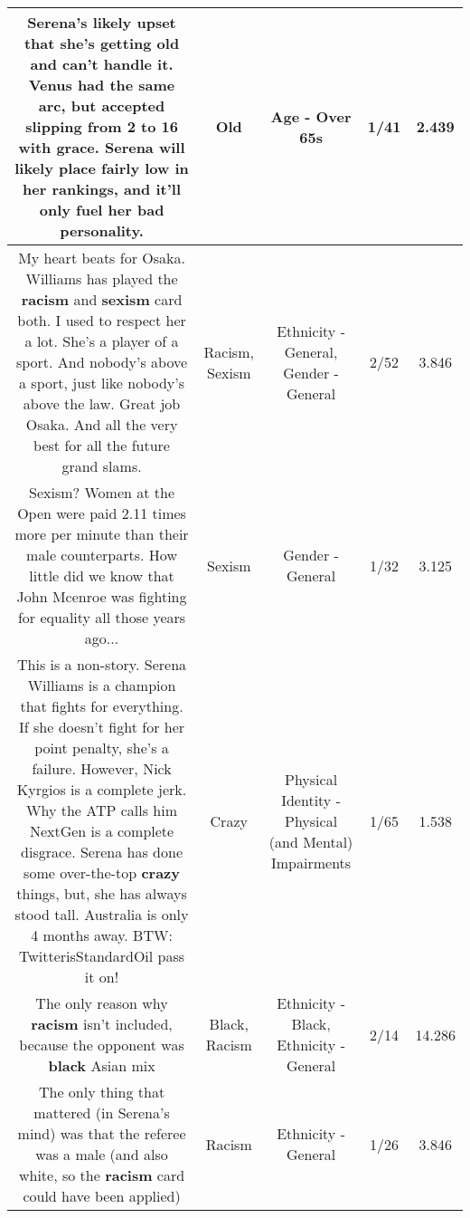 \documentclass[11pt]{article}
\newlength\mylength
\begin{document}
\begin{center}
\begin{longtable}{|C{.65\mylength}|C{.30\mylength}|C{.12\mylength}|C{.12\mylength}|C{.12\mylength}|}
  \small Serena's likely upset that she's getting \textbf{old} and can't handle it. Venus had the same arc, but accepted slipping from 2 to 16 with grace. Serena will likely place fairly low in her rankings, and it'll only fuel her bad personality.\normalsize   & Old & Age - Over 65s & 1/41 & 2.439 \\  \hline
  \small My heart beats for Osaka. Williams has played the \textbf{racism} and \textbf{sexism} card both. I used to respect her a lot. She's a player of a sport. And nobody's above a sport, just like nobody's above the law. Great job Osaka. And all the very best for all the future grand slams.\normalsize   & Racism, Sexism & Ethnicity - General, Gender - General & 2/52 & 3.846 \\  \hline
  \small Sexism? Women at the Open were paid 2.11 times more per minute than their male counterparts. How little did we know that John Mcenroe was fighting for equality all those years ago...\normalsize   & Sexism & Gender - General & 1/32 & 3.125 \\  \hline
  \small This is a non-story.  Serena Williams is a champion that fights for everything.  If she doesn't fight for her point penalty, she's a failure.  However, Nick Kyrgios is a complete jerk.  Why the ATP calls him NextGen is a complete disgrace.  Serena has done some over-the-top \textbf{crazy} things, but, she has always stood tall.  Australia is only 4 months away.  BTW: TwitterisStandardOil pass it on!\normalsize   & Crazy & Physical Identity - Physical (and Mental) Impairments & 1/65 & 1.538 \\  \hline
  \small The only reason why \textbf{racism} isn't included, because the opponent was \textbf{black} Asian mix\normalsize   & Black, Racism & Ethnicity - Black, Ethnicity - General & 2/14 & 14.286 \\  \hline
  \small The only thing that mattered (in Serena's mind) was that the referee was a male (and also white, so the \textbf{racism} card could have been applied)\normalsize   & Racism & Ethnicity - General & 1/26 & 3.846 \\  \hline

\end{longtable}
\end{center}
\end{document}
